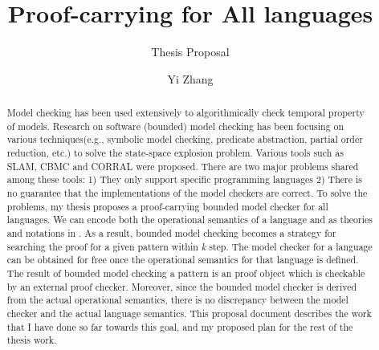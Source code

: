 \documentclass{almostllncs}
\begin{document}
\title{\large{Proof-carrying \BMC{} for All languages}}

\subtitle{\normalsize{Thesis Proposal}}

\author{Yi Zhang}

\maketitle

\begin{abstract}
Model checking has been used extensively to algorithmically check temporal property of models.
Research on software (bounded) model checking has been focusing on various techniques(e.g., symbolic model checking, predicate abstraction, partial order reduction, etc.) to solve the state-space explosion problem.
Various tools such as SLAM, CBMC and CORRAL were proposed.
There are two major problems shared among these tools: 1) They only support specific programming languages 2) There is no guarantee that the implementations of the model checkers are correct.
To solve the problems, my thesis proposes a proof-carrying bounded model checker for all languages.
We can encode both the operational semantics of a language and \modmul as theories and notations in \mmul.
As a result, bounded model checking becomes a strategy for searching the proof for a given pattern within \emph{k} step.
The model checker for a language can be obtained for free once the operational semantics for that language is defined.
The result of bounded model checking a pattern is an proof object which is checkable by an external proof checker.
Moreover, since the bounded model checker is derived from the actual operational semantics, there is no discrepancy between the model checker and the actual language semantics.
This proposal document describes the work that I have done so far towards this goal, and my proposed plan for the rest of the thesis work.

\end{abstract}
\end{document}
